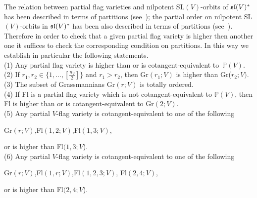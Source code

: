\documentclass[12pt]{amsart}
\theoremstyle{definition}\newtheorem{theorem}{Theorem}[section]
\theoremstyle{definition}\newtheorem{definition}[proposition]{Definition}
\theoremstyle{remark}\newtheorem{example}[proposition]{Example}
\begin{document}
The relation between partial flag varieties and nilpotent
SL$(V)$-orbits of $\frak{sl}(V)^*$ has been described in terms of
partitions (see~\cite{CM}); the partial order on nilpotent
SL$(V)$-orbits in $\frak{sl}(V)^*$ has been also described in terms
of partitions (see~\cite{CM}). Therefore in order to check that a
given partial flag variety is higher then another one it suffices to
check the corresponding condition on partitions. In this way we
establish in particular the following statements.\\(1) Any partial
flag variety is higher than or is cotangent-equivalent to~$\mathbb
P(V)$.\\(2) If $r_1, r_2\in\{1,..., [\frac{n_V}{2}]\}$ and
$r_1>r_2$, then Gr$(r_1; V)$ is higher than Gr($r_2; V)$.\\(3) The
subset of Grassmannians Gr$(r; V)$ is totally ordered.\\(4) If Fl is
a partial flag variety which is not cotangent-equivalent to $\mathbb
P(V)$, then Fl is higher than or is cotangent-equivalent to Gr$(2;
V)$.\\(5) Any partial $V$-flag variety is cotangent-equivalent to
one of the following\begin{center}Gr$(r; V)$,\hspace{10pt}Fl$(1, 2;
V)$,\hspace{10pt}Fl$(1, 3; V)$,\end{center}or is higher than Fl$(1,
3; V$).\\(6) Any partial $V$-flag variety is cotangent-equivalent to
one of the following\begin{center}Gr$(r; V)$,\hspace{10pt}Fl$(1,r;
V)$,\hspace{10pt}Fl$(1,2,3; V)$,\hspace{10pt} Fl$(2, 4;
V)$,\end{center}or is higher than Fl$(2, 4; V$).
\end{document}
